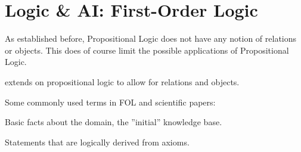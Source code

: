 \documentclass[
../../EiKI_Summary.tex,
]
{subfiles}
\begin{document}
\section{Logic \& AI: First-Order Logic}
As established before, Propositional Logic does not have any notion of relations or objects. This does of course limit the possible applications of Propositional Logic.

 extends on propositional logic to allow for relations and objects.

Some commonly used terms in FOL and scientific papers:

\begin{minipage}
    [t]{0.5\textwidth}
    \begin{defbox}
        [Axioms]
        Basic facts about the domain, the ''initial'' knowledge base.
    \end{defbox}
\end{minipage}
\begin{minipage}
    [t]{0.5\textwidth}
    \begin{defbox}
        [Theorems]
        Statements that are logically derived from axioms.
    \end{defbox}
\end{minipage}
\end{document}
